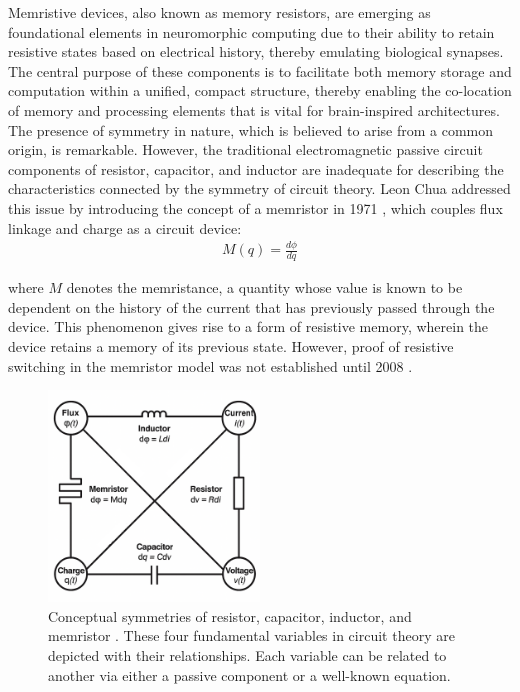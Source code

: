 Memristive devices, also known as memory resistors, are emerging as foundational elements in neuromorphic computing due to their ability to retain resistive states based on electrical history, thereby emulating biological synapses. The central purpose of these components is to facilitate both memory storage and computation within a unified, compact structure, thereby enabling the co-location of memory and processing elements that is vital for brain-inspired architectures.\\

\noindent The presence of symmetry in nature, which is believed to arise from a common origin, is remarkable.  However, the traditional electromagnetic passive circuit components of resistor, capacitor, and inductor are inadequate for describing the characteristics connected by the symmetry of circuit theory. Leon Chua addressed this issue by introducing the concept of a memristor in 1971 \cite{chua1971memristor}, which couples flux linkage and charge as a circuit device:
\begin{align}
    M(q) = \frac{d\phi}{dq} \label{eq:2.22}
\end{align}

\noindent where $M$ denotes the memristance, a quantity whose value is known to be dependent on the history of the current that has previously passed through the device. This phenomenon gives rise to a form of resistive memory, wherein the device retains a memory of its previous state. However, proof of resistive switching in the memristor model was not established until 2008 \cite{strukov2008missing}.

\begin{figure}[htbp!] 
    \centering    
    \includegraphics[width=0.5\textwidth]{Chapter2/Figs/e.png}
    \caption[Conceptual symmetries of resistor, capacitor, inductor, and memristor]{Conceptual symmetries of resistor, capacitor, inductor, and memristor \cite{du2017metal}. These four fundamental variables in circuit theory are depicted with their relationships. Each variable can be related to another via either a passive component or a well-known equation.}
    \label{fig:2e}
\end{figure}

